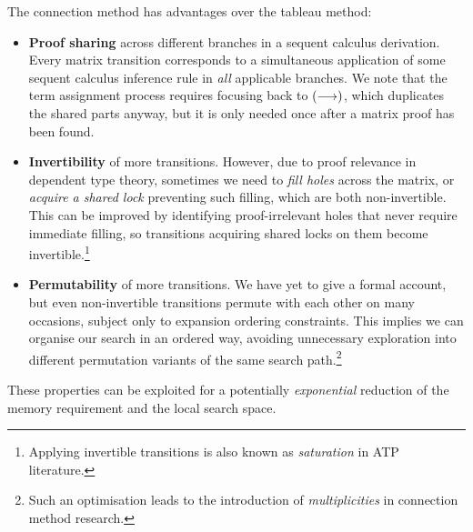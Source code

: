 \documentclass[twoside]{report}
\begin{document}
The connection method has advantages over the tableau method:

\begin{itemize}
    \item \textbf{Proof sharing} across different branches in a sequent calculus derivation. Every matrix transition corresponds to a simultaneous application of some sequent calculus inference rule in \emph{all} applicable branches. We note that the term assignment process requires focusing back to $(\longrightarrow)$, which duplicates the shared parts anyway, but it is only needed once after a matrix proof has been found.

    \item \textbf{Invertibility} of more transitions. However, due to proof relevance in dependent type theory, sometimes we need to \emph{fill holes} across the matrix, or \emph{acquire a shared lock} preventing such filling, which are both non-invertible. This can be improved by identifying proof-irrelevant holes that never require immediate filling, so transitions acquiring shared locks on them become invertible.\footnote{Applying invertible transitions is also known as \emph{saturation} in ATP literature.}

    \item \textbf{Permutability} of more transitions. We have yet to give a formal account, but even non-invertible transitions permute with each other on many occasions, subject only to expansion ordering constraints. This implies we can organise our search in an ordered way, avoiding unnecessary exploration into different permutation variants of the same search path.\footnote{Such an optimisation leads to the introduction of \emph{multiplicities} in connection method research.}
\end{itemize}

These properties can be exploited for a potentially \emph{exponential} reduction of the memory requirement and the local search space.
\end{document}
